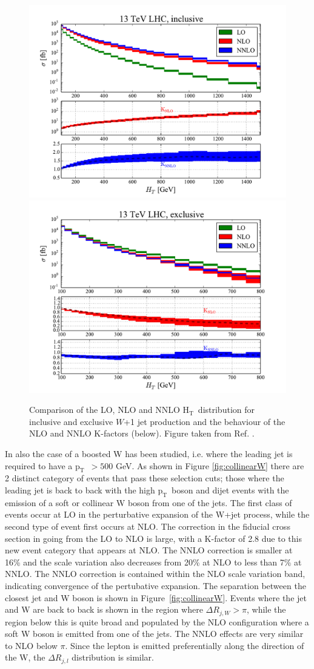 \documentclass[a4paper,11pt,notoc]{article}
\newcommand{\pt}{\ensuremath{\mathrm{p_T}}}
\newcommand{\Ht}{\ensuremath{\mathrm{H_T}}}
\begin{document}
\begin{figure}[t!]
\centering
\includegraphics[width=0.495\columnwidth]{HT_13TeV_incl.pdf} 
\includegraphics[width=0.495\columnwidth]{HT_13TeV_excl.pdf} 
\caption{Comparison of the LO, NLO and NNLO \Ht\ distribution for inclusive and exclusive $W$+1 jet production and the behaviour of the NLO and NNLO K-factors (below). Figure taken from Ref. \cite{Boughezal:2016dtm}.}
\label{fig:HT-Wjets}
\end{figure} 


  
In \cite{Boughezal:2016dtm} also the case of a boosted W has been studied, i.e. where the leading jet is required to have a \pt\ $> 500$ GeV. As shown in Figure \ref{fig:collinearW} there are 2 distinct category of events that pass these selection cuts; those where the leading jet is back to back with the high \pt\ boson and dijet events with the emission of a soft or collinear W boson from one of the jets. The first class of events occur at LO in the perturbative expansion of the W+jet process, while the second type of event first occurs at NLO. The correction in the fiducial cross section in going from the LO to NLO is large, with a K-factor of 2.8 due to this new event category that appears at NLO. The NNLO correction is smaller at 16\% and the scale variation also decreases from 20\% at NLO to less than 7\% at NNLO. The NNLO correction is contained within the NLO scale variation band, indicating convergence of the pertubative expansion. 
The separation between the closest jet and W boson is shown in Figure~\ref{fig:collinearW}. Events where the jet and W are back to back is shown in the region where $\Delta R_{j,W} > \pi$, while the region below this is quite broad and populated by the NLO configuration where a soft W boson is emitted from one of the jets. The NNLO effects are very similar to NLO below $\pi$. Since the lepton is emitted preferentially along the direction of the W, the $\Delta R_{j,l}$ distribution is similar. 
\end{document}
